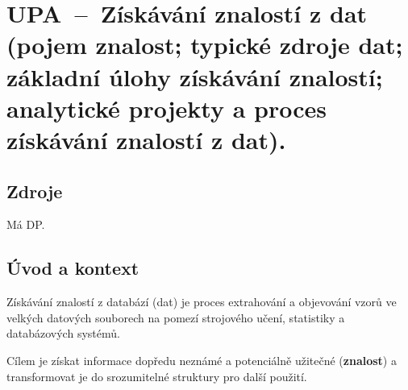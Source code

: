 

\graphicspath{{upa/ziskavani_znalosti_z_dat/figures}}


\chapter{UPA~--~Získávání znalostí z dat (pojem znalost; typické zdroje dat; základní úlohy získávání znalostí; analytické projekty a proces získávání znalostí z dat).}


\section{Zdroje}

\begin{compactitem}
    \item Má DP.
    \item {}
    \item {}
    \item {}
\end{compactitem}


\section{Úvod a kontext}

\begin{compactitem}
    \item Získávání znalostí z databází (dat) je proces extrahování a objevování vzorů ve velkých datových souborech na pomezí strojového učení, statistiky a databázových systémů.

    \item Cílem je získat informace dopředu neznámé a potenciálně užitečné (\textbf{znalost}) a transformovat je do srozumitelné struktury pro další použití.
\end{compactitem}

